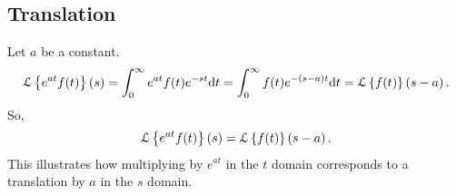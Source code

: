 \subsection{Translation}
\noindent
Let $a$ be a constant.
\begin{equation*}
	\mathcal{L}\left\{ e^{at}f(t) \right\}\left(s\right) = \int_{0}^{\infty}{e^{at}f(t)e^{-st} \mathrm{d}t} = \int_{0}^{\infty}{f(t)e^{-(s-a)t} \mathrm{d}t} = \mathcal{L}\left\{f(t)\right\}\left(s-a\right).
\end{equation*}
So,
\begin{equation*}
	\mathcal{L}\left\{ e^{at}f(t) \right\}\left(s\right) = \mathcal{L}\left\{f(t)\right\}\left(s-a\right).
\end{equation*}
This illustrates how multiplying by $e^{at}$ in the $t$ domain corresponds to a translation by $a$ in the $s$ domain.